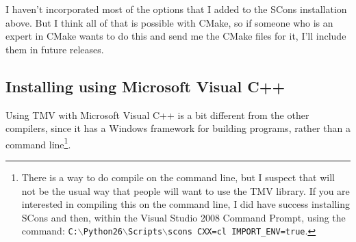 \documentclass[twoside,letterpaper,11pt]{article}
\begin{document}
I haven't incorporated most of the options that I added to the SCons installation above.
But I think all of that is possible with CMake, so if someone who is an expert in CMake wants
to do this and send me the CMake files for it, I'll include them in future releases.

\subsection{Installing using Microsoft Visual C++}
\label{Install_Microsoft}

Using TMV with Microsoft Visual C++ is a bit different from the other compilers,
since it has a Windows framework for building programs, rather than a command 
line\footnote{
There is a way to do compile on the command line, but I suspect that will not be the 
usual way that people will want to use the TMV library.  If you are interested in compiling
this on the command line, I did have success installing SCons and then, within the
Visual Studio 2008 Command Prompt, using the command:
\texttt{C:$\backslash$Python26$\backslash$Scripts$\backslash$scons CXX=cl IMPORT\_ENV=true}.}.
\end{document}

